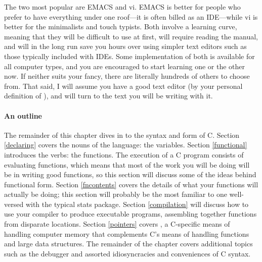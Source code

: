\documentclass[12pt]{article}
\def\ind#1{\index{#1}#1}
\begin{document}
The two most popular are \ind{EMACS} and \ind{vi}. EMACS is better for
people who prefer to have everything under one roof---it is often billed
as an IDE---while vi is better for the minimalists and touch typists. Both
involve a learning curve, meaning that they will be difficult to use at
first, will require reading the manual, and will in the long run save
you hours over using simpler text editors such as those typically
included with IDEs. Some implementation of both is available for all
computer types, and you are encouraged to start learning one or the other
now. If neither suits your fancy, there are literally hundreds of others
to choose from. That said, I will assume you have a good text editor
(by your personal definition of ), and will turn to the text you
will be writing with it.
\ifbook \else 
	
\fi
\paragraph{An outline} The remainder of this chapter dives in to the
syntax and form of C. Section \ref{declaring} covers the nouns of the
language: the variables. Section \ref{functional} introduces the verbs:
the functions. The execution of a C program consists of evaluating
functions, which means that most of the work you will be doing will be
in writing good functions, so this section will discuss some of the
ideas behind functional form. Section \ref{fncontents} covers 
the details of what your functions will actually be doing; this section
will probably be the most familiar to one well-versed with the typical
stats package. Section \ref{compilation} will discuss how to use your
compiler to produce executable programs, assembling together functions
from disparate locations. Section \ref{pointers} covers ,
a C-specific means of handling computer memory that complements C's
means of handling functions and large data structures. The remainder of
the chapter covers additional topics such as the debugger and assorted
idiosyncracies and conveniences of C syntax.
\end{document}
